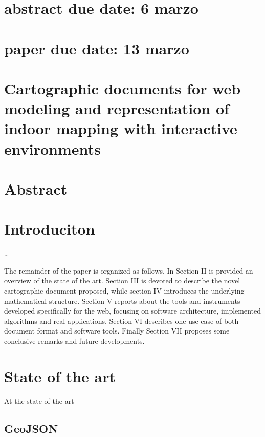 \documentclass[]{article}
\date{}
\begin{document}
\section{abstract due date: 6 marzo}\label{abstract-due-date-6-marzo}

\section{paper due date: 13 marzo}\label{paper-due-date-13-marzo}

\section{Cartographic documents for web modeling and representation of
indoor mapping with interactive
environments}\label{cartographic-documents-for-web-modeling-and-representation-of-indoor-mapping-with-interactive-environments}

\section{Abstract}\label{abstract}

\section{Introduciton}\label{introduciton}

\ldots{}

The remainder of the paper is organized as follows. In Section II is
provided an overview of the state of the art. Section III is devoted to
describe the novel cartographic document proposed, while section IV
introduces the underlying mathematical structure. Section V reports
about the tools and instruments developed specifically for the web,
focusing on software architecture, implemented algorithms and real
applications. Section VI describes one use case of both document format
and software tools. Finally Section VII proposes some conclusive remarks
and future developments.

\section{State of the art}\label{state-of-the-art}

At the state of the art

\subsection{GeoJSON}\label{geojson}
\end{document}
